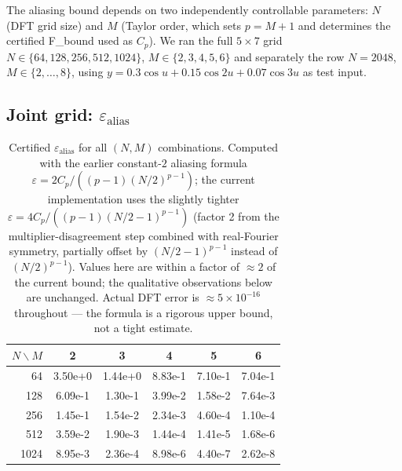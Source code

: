\documentclass[11pt]{article}
\theoremstyle{definition}
\begin{document}
The aliasing bound depends on two independently controllable parameters:
$N$ (DFT grid size) and $M$ (Taylor order, which sets $p = M+1$ and determines
the certified F\_bound used as $C_p$).
We ran the full $5\times 7$ grid
$N \in \{64,128,256,512,1024\}$, $M \in \{2,3,4,5,6\}$
and separately the row $N=2048$, $M\in\{2,\ldots,8\}$,
using $y = 0.3\cos u + 0.15\cos 2u + 0.07\cos 3u$ as test input.

\subsection{Joint grid: $\varepsilon_{\mathrm{alias}}$}

\begin{table}[H]
\centering
\begin{tabular}{r|ccccc}
\toprule
$N \backslash M$ & 2 & 3 & 4 & 5 & 6 \\
\midrule
64   & 3.50e+0 & 1.44e+0 & 8.83e-1 & 7.10e-1 & 7.04e-1 \\
128  & 6.09e-1 & 1.30e-1 & 3.99e-2 & 1.58e-2 & 7.64e-3 \\
256  & 1.45e-1 & 1.54e-2 & 2.34e-3 & 4.60e-4 & 1.10e-4 \\
512  & 3.59e-2 & 1.90e-3 & 1.44e-4 & 1.41e-5 & 1.68e-6 \\
1024 & 8.95e-3 & 2.36e-4 & 8.98e-6 & 4.40e-7 & 2.62e-8 \\
\bottomrule
\end{tabular}
\caption{Certified $\varepsilon_{\mathrm{alias}}$ for all $(N,M)$ combinations.
         Computed with the earlier constant-$2$ aliasing formula
         $\varepsilon = 2C_p/((p{-}1)(N/2)^{p-1})$; the current implementation
         uses the slightly tighter
         $\varepsilon = 4C_p/((p{-}1)(N/2-1)^{p-1})$ (factor 2 from the
         multiplier-disagreement step combined with real-Fourier symmetry,
         partially offset by $(N/2-1)^{p-1}$ instead of $(N/2)^{p-1}$).  Values
         here are within a factor of $\approx 2$ of the current bound; the
         qualitative observations below are unchanged.  Actual DFT error is
         $\approx 5\times10^{-16}$ throughout --- the formula is a rigorous
         upper bound, not a tight estimate.}
\label{tab:grid}
\end{table}
\end{document}
